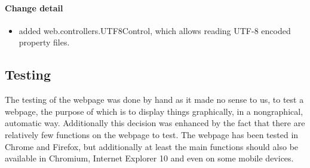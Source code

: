 \paragraph{Change detail}
\begin{itemize}
  \item added web.controllers.UTF8Control, which allows reading UTF-8 encoded property files.
\end{itemize}

\subsection{Testing}
The testing of the webpage was done by hand as it made no sense to us, to test a webpage, 
the purpose of which is to display things graphically, in a nongraphical, automatic way.
Additionally this decision was enhanced by the fact that there are relatively few functions on the webpage to test.
The webpage has been tested in Chrome and Firefox, but additionally at least the main functions should also be available in Chromium,
Internet Explorer 10 and even on some mobile devices.
